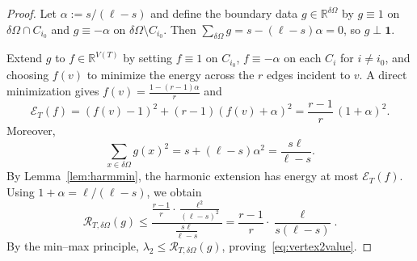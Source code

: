 \documentclass[11pt]{article}
\theoremstyle{definition}
\theoremstyle{remark}
\newcommand{\RR}{\mathbb{R}}
\newcommand{\dO}{\delta\Omega}
\begin{document}
\begin{proof}
Let $\alpha:=s/(\ell-s)$ and define the boundary data $g\in\RR^{\dO}$ by $g\equiv 1$ on $\dO\cap C_{i_0}$ and $g\equiv -\alpha$ on $\dO\setminus C_{i_0}$.
Then $\sum_{\dO}g=s-(\ell-s)\alpha=0$, so $g\perp\mathbf{1}$.

Extend $g$ to $f\in\RR^{V(T)}$ by setting $f\equiv 1$ on $C_{i_0}$, $f\equiv -\alpha$ on each $C_i$ for $i\neq i_0$, and choosing $f(v)$ to minimize the energy across the $r$ edges incident to $v$.
A direct minimization gives $f(v)=\frac{1-(r-1)\alpha}{r}$ and
\[
\mathcal{E}_T(f)=(f(v)-1)^2+(r-1)(f(v)+\alpha)^2=\frac{r-1}{r}\,(1+\alpha)^2.
\]
Moreover,
\[
\sum_{x\in\dO}g(x)^2=s+(\ell-s)\alpha^2=\frac{s\ell}{\ell-s}.
\]
By Lemma~\ref{lem:harmmin}, the harmonic extension has energy at most $\mathcal{E}_T(f)$.
Using $1+\alpha=\ell/(\ell-s)$, we obtain
\[
\mathcal{R}_{T,\dO}(g)\le \frac{\frac{r-1}{r}\cdot\frac{\ell^2}{(\ell-s)^2}}{\frac{s\ell}{\ell-s}}
=\frac{r-1}{r}\cdot\frac{\ell}{s(\ell-s)}.
\]
By the min--max principle, $\lambda_2\le \mathcal{R}_{T,\dO}(g)$, proving~\eqref{eq:vertex2value}.
\end{proof}
\end{document}
